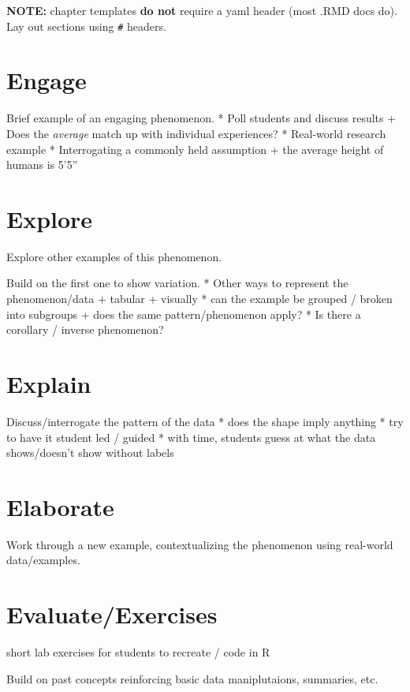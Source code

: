 \documentclass[
]{book}
\begin{document}
\textbf{NOTE:} chapter templates \textbf{do not} require a yaml header (most .RMD docs do). Lay out sections using \texttt{\#} headers.

\hypertarget{engage-2}{%
\chapter{Engage}\label{engage-2}}

Brief example of an engaging phenomenon.
* Poll students and discuss results
+ Does the \emph{average} match up with individual experiences?
* Real-world research example
* Interrogating a commonly held assumption
+ the average height of humans is 5'5''

\hypertarget{explore-2}{%
\chapter{Explore}\label{explore-2}}

Explore other examples of this phenomenon.

Build on the first one to show variation.
* Other ways to represent the phenomenon/data
+ tabular
+ visually
* can the example be grouped / broken into subgroups
+ does the same pattern/phenomenon apply?
* Is there a corollary / inverse phenomenon?

\hypertarget{explain-2}{%
\chapter{Explain}\label{explain-2}}

Discuss/interrogate the pattern of the data
* does the shape imply anything
* try to have it student led / guided
* with time, students guess at what the data shows/doesn't show without labels

\hypertarget{elaborate-2}{%
\chapter{Elaborate}\label{elaborate-2}}

Work through a new example, contextualizing the phenomenon using real-world data/examples.

\hypertarget{evaluateexercises-2}{%
\chapter{Evaluate/Exercises}\label{evaluateexercises-2}}

short lab exercises for students to recreate / code in R

Build on past concepts reinforcing basic data maniplutaions, summaries, etc.

  
\end{document}
